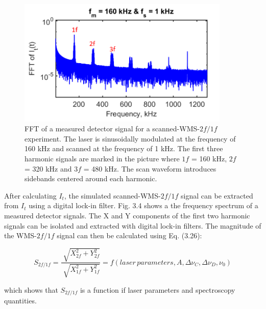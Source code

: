  \begin{figure}[h]
    \centering
        \includegraphics[trim = 0mm 0mm 0mm 0mm, clip=true, width=0.9\textwidth]{fig/ch3_fig5.png}
        \caption{FFT of a measured detector signal for a scanned-WMS-$2f/1f$ experiment. The laser is sinusoidally modulated at the frequency of 160 kHz and scanned at the frequency of 1 kHz. The first three harmonic signals are marked in the picture where $1f$ = 160 kHz, $2f$ = 320 kHz and $3f$ = 480 kHz. The scan waveform introduces sidebands centered around each harmonic.}
    \label{fig:ch3_4}
\end{figure}

After calculating $I_t$, the simulated scanned-WMS-$2f/1f$ signal can be extracted from $I_t$ using a digital lock-in filter. Fig. 3.4 shows a the frequency spectrum of a measured detector signals. The X and Y components of the first two harmonic signals can be isolated and extracted with digital lock-in filters. The magnitude of the WMS-$2f/1f$ signal can then be calculated using Eq. (3.26):

\begin{equation}
S_{2f/1f}=\frac{\sqrt[]{X_{2f}^2+Y_{2f}^2}}{\sqrt[]{X_{1f}^2+Y_{1f}^2}}=f(laser\,parameters,A,\Delta\nu_C,\Delta\nu_D,\nu_0)
\end{equation}

\vspace{3mm}
\noindent which shows that $S_{2f/1f}$ is a function if laser parameters and spectroscopy quantities.

